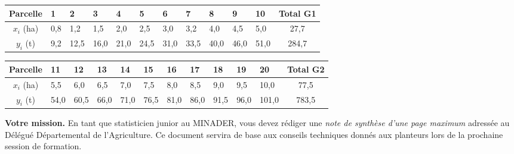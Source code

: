 \documentclass[11pt]{article}
\begin{document}
\begin{center}
\begin{tabularx}{\linewidth}{|c|*{10}{X|}c|}\hline
\rowcolor{popblueL}
\textbf{Parcelle} & 1 & 2 & 3 & 4 & 5 & 6 & 7 & 8 & 9 & 10 & \textbf{Total G1} \\ \hline
$x_i$ (ha) & 0,8 & 1,2 & 1,5 & 2,0 & 2,5 & 3,0 & 3,2 & 4,0 & 4,5 & 5,0 & 27,7 \\ \hline
$y_i$ (t)  & 9,2 & 12,5 & 16,0 & 21,0 & 24,5 & 31,0 & 33,5 & 40,0 & 46,0 & 51,0 & 284,7 \\ \hline
\end{tabularx}
\end{center}
\vspace{0.2cm}
\begin{center}
\begin{tabularx}{\linewidth}{|c|*{10}{X|}c|}\hline
\rowcolor{poporangeL}
\textbf{Parcelle} & 11 & 12 & 13 & 14 & 15 & 16 & 17 & 18 & 19 & 20 & \textbf{Total G2} \\ \hline
$x_i$ (ha) & 5,5 & 6,0 & 6,5 & 7,0 & 7,5 & 8,0 & 8,5 & 9,0 & 9,5 & 10,0 & 77,5 \\ \hline
$y_i$ (t)  & 54,0 & 60,5 & 66,0 & 71,0 & 76,5 & 81,0 & 86,0 & 91,5 & 96,0 & 101,0 & 783,5 \\ \hline
\end{tabularx}
\end{center}

\vspace{0.3cm}
\noindent \textbf{Votre mission.} En tant que statisticien junior au MINADER, vous devez rédiger une \emph{note de synthèse d'une page maximum} adressée au Délégué Départemental de l'Agriculture. Ce document servira de base aux conseils techniques donnés aux planteurs lors de la prochaine session de formation.
\end{document}
